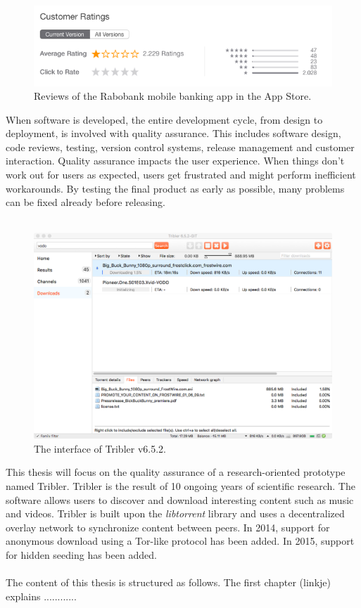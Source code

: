 \begin{figure}[!h]
	\centering
	\includegraphics[width=0.6\columnwidth]{images/rabobank_ratings}
	\caption{Reviews of the Rabobank mobile banking app in the App Store.}
	\label{fig:rabobank_reviews}
\end{figure}

When software is developed, the entire development cycle, from design to deployment, is involved with quality assurance. This includes software design, code reviews, testing, version control systems, release management and customer interaction. Quality assurance impacts the user experience.
When things don't work out for users as expected, users get frustrated and might perform inefficient workarounds. By testing the final product as early as possible, many problems can be fixed already before releasing.\\\\

\begin{figure}[!h]
	\centering
	\includegraphics[width=0.9\columnwidth]{images/tribler_interface}
	\caption{The interface of Tribler v6.5.2.}
	\label{fig:tribler_interface}
\end{figure}

This thesis will focus on the quality assurance of a research-oriented prototype named Tribler. Tribler is the result of 10 ongoing years of scientific research. The software allows users to discover and download interesting content such as music and videos. Tribler is built upon the \emph{libtorrent} library and uses a decentralized overlay network to synchronize content between peers. In 2014, support for anonymous download using a Tor-like protocol has been added. In 2015, support for hidden seeding has been added.\\\\
The content of this thesis is structured as follows. The first chapter (linkje) explains ............
